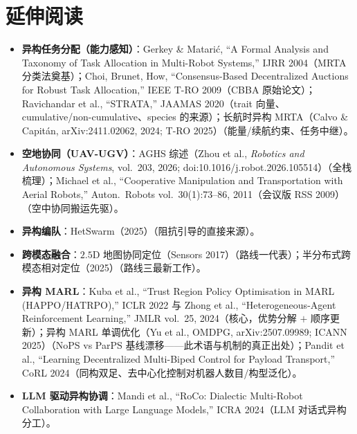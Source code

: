\section*{延伸阅读}
\label{sec:hmr-reading}
\begin{itemize}
  \item \textbf{异构任务分配（能力感知）}：Gerkey \& Matari\'c, ``A Formal Analysis and Taxonomy of Task Allocation in Multi-Robot Systems,'' IJRR 2004\cite{gerkey2004taxonomy}（MRTA 分类法奠基）；Choi, Brunet, How, ``Consensus-Based Decentralized Auctions for Robust Task Allocation,'' IEEE T-RO 2009\cite{choi2009cbba}（CBBA 原始论文）；Ravichandar et al., ``STRATA,'' JAAMAS 2020\cite{ravichandar2019strata}（trait 向量、cumulative/non-cumulative、species 的来源）；长航时异构 MRTA（Calvo \& Capit\'an, arXiv:2411.02062, 2024; T-RO 2025）\cite{hmrta2024longendurance}（能量/续航约束、任务中继）。
  \item \textbf{空地协同（UAV-UGV）}：AGHS 综述（Zhou et al., \emph{Robotics and Autonomous Systems}, vol.\ 203, 2026; doi:10.1016/j.robot.2026.105514）\cite{aghs2024survey}（全栈梳理）；Michael et al., ``Cooperative Manipulation and Transportation with Aerial Robots,'' Auton.\ Robots vol.\ 30(1):73--86, 2011（会议版 RSS 2009）\cite{michael2014aerial}（空中协同搬运先驱）。
  \item \textbf{异构编队}：HetSwarm（2025）\cite{hetswarm2025}（阻抗引导的直接来源）。
  \item \textbf{跨模态融合}：$2.5\mathrm{D}$ 地图协同定位（Sensors 2017）\cite{aghs25dmap2017}（路线一代表）；半分布式跨模态相对定位（2025）\cite{crossmodal2025semidist}（路线三最新工作）。
  \item \textbf{异构 MARL}：Kuba et al., ``Trust Region Policy Optimisation in MARL (HAPPO/HATRPO),'' ICLR 2022\cite{kuba2022happo} 与 Zhong et al., ``Heterogeneous-Agent Reinforcement Learning,'' JMLR vol.\ 25, 2024\cite{zhong2024harl}（核心，优势分解 $+$ 顺序更新）；异构 MARL 单调优化（Yu et al., OMDPG, arXiv:2507.09989; ICANN 2025）\cite{hmarl2025ompg}（NoPS vs ParPS 基线漂移——此术语与机制的真正出处）；Pandit et al., ``Learning Decentralized Multi-Biped Control for Payload Transport,'' CoRL 2024\cite{pandit2025biped}（同构双足、去中心化控制对机器人数目/构型泛化）。
  \item \textbf{LLM 驱动异构协调}：Mandi et al., ``RoCo: Dialectic Multi-Robot Collaboration with Large Language Models,'' ICRA 2024\cite{mandi2024roco}（LLM 对话式异构分工）。
\end{itemize}

